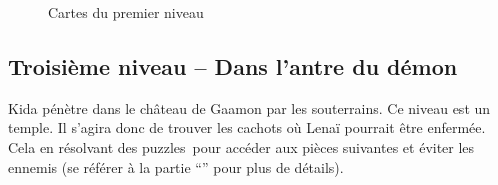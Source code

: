 \begin{figure}[ph!]
	\centering	
	
	
	\caption{\label{fig:carteQuartierPauvre}Cartes du premier niveau}
\end{figure}


\subsection[Niveau 3 -- Dans l'antre du démon]{Troisième niveau -- Dans l'antre du démon}
\label{sec:entreDemon}
Kida pénètre dans le château de Gaamon par les souterrains. Ce niveau est un temple. Il s'agira donc de trouver les cachots où Lenaï pourrait être enfermée. Cela en résolvant des puzzles\ pour accéder aux pièces suivantes et éviter les ennemis (se référer à la partie \enquote{} pour plus de détails).

